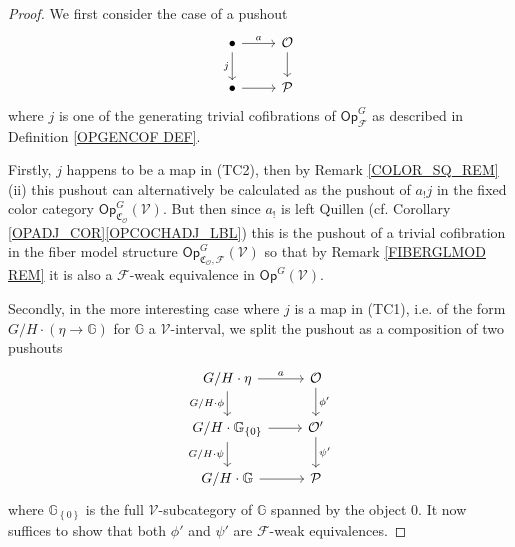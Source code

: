\documentclass[a4paper,10pt
,draft
]{article}%
\numberwithin{equation}{section}
\numberwithin{figure}{section}
\theoremstyle{definition} %
\newcommand{\set}[1]{\left\{#1\right\}}%
\newcommand{\F}{\ensuremath{\mathcal F}}
\newcommand{\V}{\ensuremath{\mathcal V}}
\renewcommand{\O}{\ensuremath{\mathcal O}}
\renewcommand{\P}{\ensuremath{\mathcal P}}
\newcommand{\1}{\ensuremath{\mathbbm 1}}%
\begin{document}
\begin{proof}
We first consider the case of a pushout
\begin{equation}\label{JUSTAPUSH EQ}
\begin{tikzcd}
		 \bullet \ar{r}{a} \arrow{d}[swap]{j}
	&
		\O \arrow{d}
\\
		\bullet \ar{r} 
	&
		\P
\end{tikzcd}
\end{equation}
where $j$ is one of the generating trivial cofibrations of $\mathsf{Op}^G_{\F}$ as described in Definition \ref{OPGENCOF DEF}.

Firstly, $j$ happens to be a map in (TC2), then by Remark \ref{COLOR_SQ_REM}(ii)
this pushout can alternatively be calculated as the pushout of $a_! j$
in the fixed color category $\mathsf{Op}^{G}_{\mathfrak C_{\O}}(\V)$.
But then since $a_!$ is left Quillen (cf. Corollary \ref{OPADJ_COR}\ref{OPCOCHADJ_LBL}) %
this is the pushout of a trivial cofibration in the fiber model structure
$\mathsf{Op}^{G}_{\mathfrak C_{\O},\F}(\V)$ so that by Remark \ref{FIBERGLMOD REM} it is also a $\F$-weak equivalence in 
$\mathsf{Op}^{G}(\V)$.
	
Secondly, in the more interesting case where $j$ is a map in (TC1), 
i.e. of the form $G/H \cdot (\eta \to \mathbb{G})$ for $\mathbb{G}$ a $\V$-interval,
we split the pushout as a composition of two pushouts 
      \begin{equation}\label{BROKENPUSH EQ}
            \begin{tikzcd}
                  G/H \cdot \eta \arrow[r, "a"] \arrow[d, "G/H \cdot \phi"']
                  &
                  \O \arrow[d,"\phi'"]
                  \\
                  G/H \cdot \mathbb{G}_{\set{0}} \arrow[r] \arrow[d, "G/H \cdot \psi"']
                  &
                  \O' \arrow[d,"\psi'"]
                  \\
                  G/H \cdot \mathbb{G} \arrow[r]
                  &
                  \P
            \end{tikzcd}
      \end{equation}
      where $\mathbb{G}_{\set{0}}$ is the full $\V$-subcategory of $\mathbb{G}$ spanned by the object $0$.
      It now suffices to show that both $\phi'$ and $\psi'$ are $\F$-weak equivalences.


\end{proof}
\end{document}
